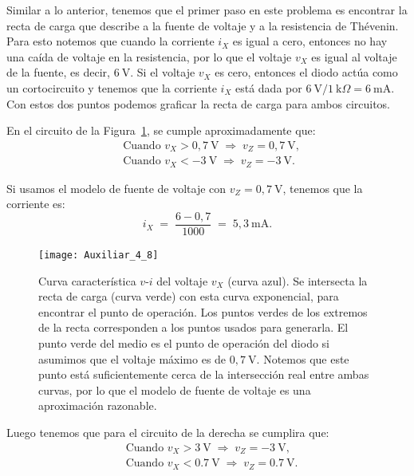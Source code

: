 \documentclass[
  11pt,
  letterpaper,
   addpoints,
   answers
  ]{exam}
\begin{document}
\begin{questions}
\begin{solution}

Similar a lo anterior, tenemos que el primer paso en este problema es encontrar la recta de carga que describe a la fuente de voltaje y a la resistencia de Thévenin. Para esto notemos que cuando la corriente \(i_X\) es igual a cero, entonces no hay una caída de voltaje en la resistencia, por lo que el voltaje \(v_X\) es igual al voltaje de la fuente, es decir, \(6~\text{V}\). Si el voltaje \(v_X\) es cero, entonces el diodo actúa como un cortocircuito y tenemos que la corriente \(i_X\) está dada por \(6~\text{V}/1~\text{k}\Omega = 6~\text{mA}\). Con estos dos puntos podemos graficar la recta de carga para ambos circuitos.

\medskip
En el circuito de la Figura~\ref{fig:carac-v-i}, se cumple aproximadamente que:
\begin{align*}
&\text{Cuando } v_X > 0{,}7~\text{V} \;\Rightarrow\; v_Z = 0{,}7~\text{V},\\
&\text{Cuando } v_X < -3~\text{V} \;\Rightarrow\; v_Z = -3~\text{V}.
\end{align*}

Si usamos el modelo de fuente de voltaje con \(v_Z = 0{,}7~\text{V}\), tenemos que la corriente es:
\[
i_X \;=\; \frac{6 - 0{,}7}{1000} \;=\; 5{,}3~\text{mA}.
\]

\begin{figure}[H]
  \centering
  \texttt{[image: Auxiliar\_4\_8]}
  \caption{Curva característica \(v\)-\(i\) del voltaje \(v_X\) (curva azul). 
  Se intersecta la recta de carga (curva verde) con esta curva exponencial, para encontrar el punto de operación. 
  Los puntos verdes de los extremos de la recta corresponden a los puntos usados para generarla. 
  El punto verde del medio es el punto de operación del diodo si asumimos que el voltaje máximo es de \(0{,}7~\text{V}\). 
  Notemos que este punto está suficientemente cerca de la intersección real entre ambas curvas, por lo que el modelo de fuente de voltaje es una aproximación razonable.}
  \label{fig:carac-v-i}
\end{figure}

Luego tenemos que para el circuito de la derecha se cumplira que:
\begin{align*}
&\text{Cuando } v_X > 3~\text{V} \;\Rightarrow\; v_Z = -3~\text{V},\\
&\text{Cuando } v_X < 0.7~\text{V} \;\Rightarrow\; v_Z = 0.7~\text{V}.
\end{align*}


\end{solution}
\end{questions}
\end{document}
